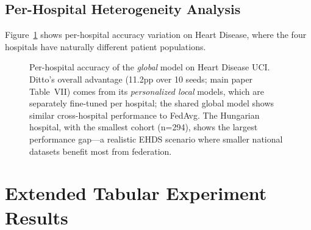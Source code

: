 \documentclass[conference]{IEEEtran}
\begin{document}
\subsection{Per-Hospital Heterogeneity Analysis}

Figure~\ref{fig:per_hospital} shows per-hospital accuracy variation on Heart Disease, where the four hospitals have naturally different patient populations.

\begin{figure}[htbp]
\centering
{}
\caption{Per-hospital accuracy of the \textit{global} model on Heart Disease UCI. Ditto's overall advantage (11.2pp over 10 seeds; main paper Table~VII) comes from its \textit{personalized local} models, which are separately fine-tuned per hospital; the shared global model shows similar cross-hospital performance to FedAvg. The Hungarian hospital, with the smallest cohort (n=294), shows the largest performance gap---a realistic EHDS scenario where smaller national datasets benefit most from federation.}
\label{fig:per_hospital}
\end{figure}

\section{Extended Tabular Experiment Results}
\label{sec:extended_tabular}
\end{document}
